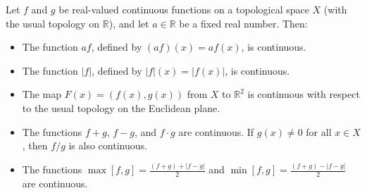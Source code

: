 Let $f$ and $g$ be real-valued continuous functions on a topological space $X$ (with the usual topology on $\mathbb{R}$), and let $a \in \mathbb{R}$ be a fixed real number. Then:

\begin{itemize}
\item[(a)] The function $a f$, defined by $(a f)(x) = a f(x)$, is continuous.
\item[(b)] The function $|f|$, defined by $|f|(x) = |f(x)|$, is continuous.
\item[(c)] The map $F(x) = (f(x), g(x))$ from $X$ to $\mathbb{R}^2$ is continuous with respect to the usual topology on the Euclidean plane.
\item[(d)] The functions $f + g$, $f - g$, and $f \cdot g$ are continuous. If $g(x) \neq 0$ for all $x \in X$, then $f / g$ is also continuous.
\item[(e)] The functions $\max[f, g] = \frac{(f+g) + |f-g|}{2}$ and $\min[f, g] = \frac{(f+g) - |f-g|}{2}$ are continuous.
\end{itemize}
